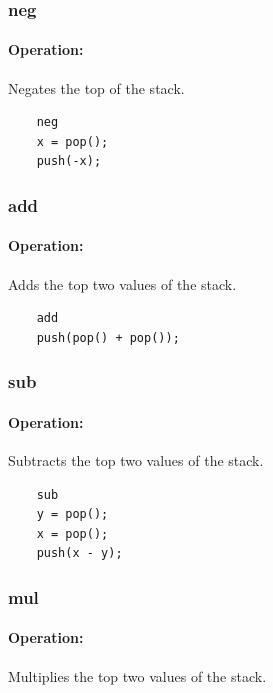 \subsubsection{neg}

\paragraph{Operation:}
Negates the top of the stack.

	\begin{lstlisting}
	neg
	x = pop();
	push(-x);
	\end{lstlisting}

\subsubsection{add}

\paragraph{Operation:}
Adds the top two values of the stack.

	\begin{lstlisting}
	add
	push(pop() + pop());
	\end{lstlisting}

\subsubsection{sub}

\paragraph{Operation:}
Subtracts the top two values of the stack.

	\begin{lstlisting}
	sub
	y = pop();
	x = pop();
	push(x - y);
	\end{lstlisting}

\subsubsection{mul}

\paragraph{Operation:}
Multiplies the top two values of the stack.

